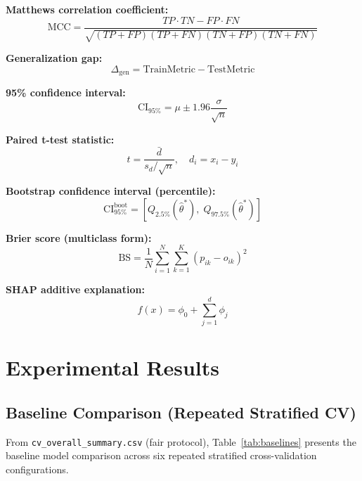 \documentclass[10pt,twocolumn,letterpaper]{IEEEtran}
\begin{document}
\textbf{Matthews correlation coefficient:}
\begin{equation}
\mathrm{MCC} = \frac{TP\cdot TN - FP\cdot FN}{\sqrt{(TP+FP)(TP+FN)(TN+FP)(TN+FN)}}
\end{equation}

\textbf{Generalization gap:}
\begin{equation}
\Delta_{\text{gen}} = \mathrm{TrainMetric} - \mathrm{TestMetric}
\end{equation}

\textbf{95\% confidence interval:}
\begin{equation}
\mathrm{CI}_{95\%} = \mu \pm 1.96\frac{\sigma}{\sqrt{n}}
\end{equation}

\textbf{Paired t-test statistic:}
\begin{equation}
t = \frac{\bar{d}}{s_d/\sqrt{n}}, \quad d_i = x_i - y_i
\end{equation}

\textbf{Bootstrap confidence interval (percentile):}
\begin{equation}
\mathrm{CI}_{95\%}^{\text{boot}} = [Q_{2.5\%}(\hat{\theta}^*),\; Q_{97.5\%}(\hat{\theta}^*)]
\end{equation}

\textbf{Brier score (multiclass form):}
\begin{equation}
\mathrm{BS} = \frac{1}{N}\sum_{i=1}^{N}\sum_{k=1}^{K}(p_{ik}-o_{ik})^2
\end{equation}

\textbf{SHAP additive explanation:}
\begin{equation}
f(x) = \phi_0 + \sum_{j=1}^{d} \phi_j
\end{equation}

\section{Experimental Results}

\subsection{Baseline Comparison (Repeated Stratified CV)}
From \texttt{cv\_overall\_summary.csv} (fair protocol), Table~\ref{tab:baselines} presents the baseline model comparison across six repeated stratified cross-validation configurations.
\end{document}
